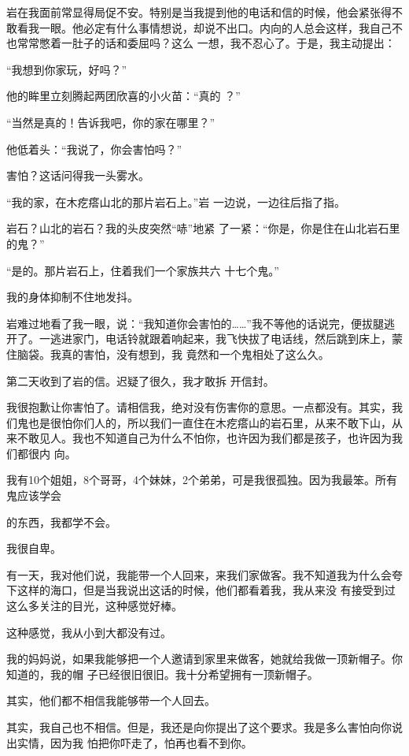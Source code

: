 \documentclass{article}
\begin{document}
岩在我面前常显得局促不安。特别是当我提到他的电话和信的时候，他会紧张得不敢看我一眼。他必定有什么事情想说，却说不出口。内向的人总会这样，我自己不也常常憋着一肚子的话和委屈吗？这么
一想，我不忍心了。于是，我主动提出： 


\newpage

“我想到你家玩，好吗？” 

他的眸里立刻腾起两团欣喜的小火苗：“真的
？” 

“当然是真的！告诉我吧，你的家在哪里？”
 


他低着头：“我说了，你会害怕吗？” 


害怕？这话问得我一头雾水。 

“我的家，在木疙瘩山北的那片岩石上。”岩
一边说，一边往后指了指。 

岩石？山北的岩石？我的头皮突然“哧”地紧
了一紧：“你是，你是住在山北岩石里的鬼？” 

“是的。那片岩石上，住着我们一个家族共六
十七个鬼。” 


\newpage

我的身体抑制不住地发抖。 

岩难过地看了我一眼，说：“我知道你会害怕的……”我不等他的话说完，便拔腿逃开了。一逃进家门，电话铃就跟着响起来，我飞快拔了电话线，然后跳到床上，蒙住脑袋。我真的害怕，没有想到，我
竟然和一个鬼相处了这么久。 

第二天收到了岩的信。迟疑了很久，我才敢拆
开信封。 


我很抱歉让你害怕了。请相信我，绝对没有伤害你的意思。一点都没有。其实，我们鬼也是很怕你们人的，所以我们一直住在木疙瘩山的岩石里，从来不敢下山，从来不敢见人。我也不知道自己为什么不怕你，也许因为我们都是孩子，也许因为我们都很内
向。 

我有10个姐姐，8个哥哥，4个妹妹，2个弟弟，可是我很孤独。因为我最笨。所有鬼应该学会

\newpage
的东西，我都学不会。 


我很自卑。 

有一天，我对他们说，我能带一个人回来，来我们家做客。我不知道我为什么会夸下这样的海口，但是当我说出这话的时候，他们都看着我，我从来没
有接受到过这么多关注的目光，这种感觉好棒。 


这种感觉，我从小到大都没有过。 

我的妈妈说，如果我能够把一个人邀请到家里来做客，她就给我做一顶新帽子。你知道的，我的帽
子已经很旧很旧。我十分希望拥有一顶新帽子。 


其实，他们都不相信我能够带一个人回去。 

其实，我自己也不相信。但是，我还是向你提出了这个要求。我是多么害怕向你说出实情，因为我
怕把你吓走了，怕再也看不到你。 
\end{document}
